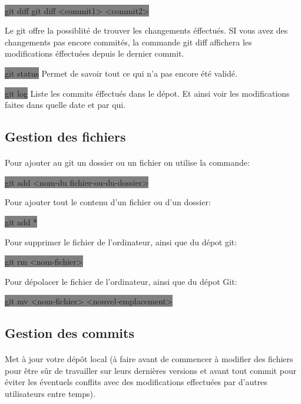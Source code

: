 \documentclass[11pt,a4paper,titlepage, oneside]{article}
\begin{document}
		\paragraph{}
			\colorbox{gray}{git diff git diff <commit1> <commit2>}

			Le git offre la possiblité de trouver les changements éffectués. SI vous avez des changements pas encore commités, la commande git diff affichera les modifications éffectuées depuis le dernier commit.

			\colorbox{gray}{git status} Permet de savoir tout ce qui n'a pas encore été validé.
	
			\colorbox{gray}{git log} Liste les commits éffectués dans le dépot. Et ainsi voir les modifications faites dans quelle date et par qui.

	\subsection{{\color{red} Gestion des fichiers}}

		\paragraph{}
			Pour ajouter au git un dossier ou un fichier on utilise la commande:

			\colorbox{gray}{git add <nom-du fichier-ou-du-dossier>}

			Pour ajouter tout le contenu d'un fichier ou d'un dossier:

			\colorbox{gray}{git add *}

			Pour supprimer le fichier de l'ordinateur, ainsi que du dépot git:		
			
			\colorbox{gray}{git rm <nom-fichier>}

			Pour dépolacer le fichier de l'ordinateur, ainsi que du dépot Git:
			
			\colorbox{gray}{git mv <nom-fichier> <nouvel-emplacement>}

	\subsection{{\color{red} Gestion des commits}}

		\paragraph{}
			Met à jour votre dépôt local (à faire avant de commencer à modifier des fichiers pour être sûr de travailler sur leurs dernières versions et avant tout commit pour éviter les éventuels conflits avec des modifications effectuées par d'autres utilisateurs entre temps). 
\end{document}
